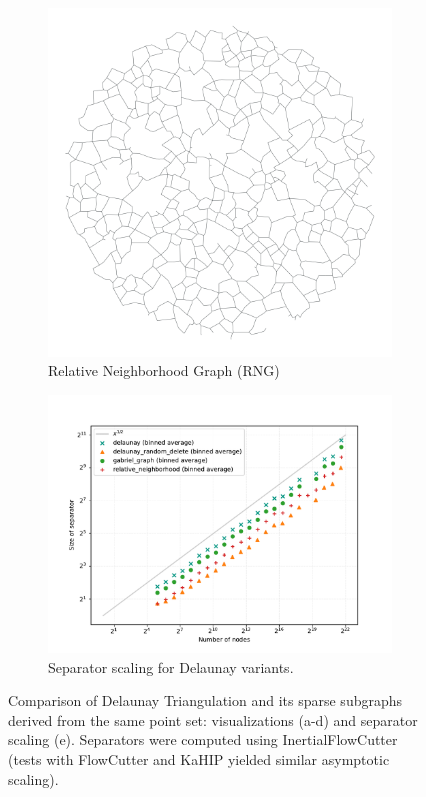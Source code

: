 \begin{figure}[tbhp]
	\begin{subfigure}[t]{0.3\linewidth}
		\centering
		\includegraphics[width=\linewidth]{graphics/relative_neighborhood.png}
		\caption{Relative Neighborhood Graph (RNG)}
		\label{fig:delaunay_rng_viz}
	\end{subfigure}
	\hfill
	\begin{subfigure}[t]{0.6\linewidth}
		\centering
		\includegraphics[width=\linewidth]{graphics/delaunay_variants_sep.pdf}
		\caption{Separator scaling for Delaunay variants.}
		\label{fig:delaunay_variants_sep_plot}
	\end{subfigure}
	\caption{Comparison of Delaunay Triangulation and its sparse subgraphs derived from the same point set: visualizations (a-d) and separator scaling (e). Separators were computed using InertialFlowCutter (tests with FlowCutter and KaHIP yielded similar asymptotic scaling).}
	\label{fig:delaunay_variants_comparison}
\end{figure}

